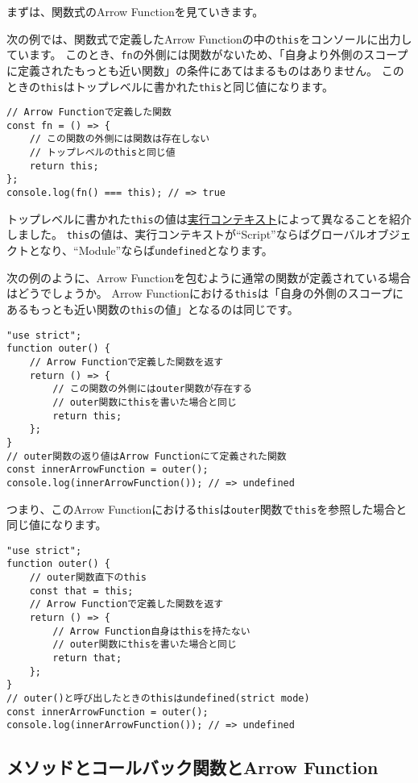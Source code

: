 まずは、関数式のArrow Functionを見ていきます。

次の例では、関数式で定義したArrow
Functionの中の\texttt{this}をコンソールに出力しています。
このとき、\texttt{fn}の外側には関数がないため、「自身より外側のスコープに定義されたもっとも近い関数」の条件にあてはまるものはありません。
このときの\texttt{this}はトップレベルに書かれた\texttt{this}と同じ値になります。

\begin{lstlisting}
// Arrow Functionで定義した関数
const fn = () => {
    // この関数の外側には関数は存在しない
    // トップレベルのthisと同じ値
    return this;
};
console.log(fn() === this); // => true
\end{lstlisting}

トップレベルに書かれた\texttt{this}の値は\hyperlink{execution-context-this}{実行コンテキスト}によって異なることを紹介しました。
\texttt{this}の値は、実行コンテキストが``Script''ならばグローバルオブジェクトとなり、``Module''ならば\texttt{undefined}となります。

次の例のように、Arrow
Functionを包むように通常の関数が定義されている場合はどうでしょうか。
Arrow
Functionにおける\texttt{this}は「自身の外側のスコープにあるもっとも近い関数の\texttt{this}の値」となるのは同じです。

\begin{lstlisting}
"use strict";
function outer() {
    // Arrow Functionで定義した関数を返す
    return () => {
        // この関数の外側にはouter関数が存在する
        // outer関数にthisを書いた場合と同じ
        return this;
    };
}
// outer関数の返り値はArrow Functionにて定義された関数
const innerArrowFunction = outer();
console.log(innerArrowFunction()); // => undefined
\end{lstlisting}

つまり、このArrow
Functionにおける\texttt{this}は\texttt{outer}関数で\texttt{this}を参照した場合と同じ値になります。

\begin{lstlisting}
"use strict";
function outer() {
    // outer関数直下のthis
    const that = this;
    // Arrow Functionで定義した関数を返す
    return () => {
        // Arrow Function自身はthisを持たない
        // outer関数にthisを書いた場合と同じ
        return that;
    };
}
// outer()と呼び出したときのthisはundefined(strict mode)
const innerArrowFunction = outer();
console.log(innerArrowFunction()); // => undefined
\end{lstlisting}

\hypertarget{method-callback-arrow-function}{%
\subsection{メソッドとコールバック関数とArrow
Function}\label{method-callback-arrow-function}}

